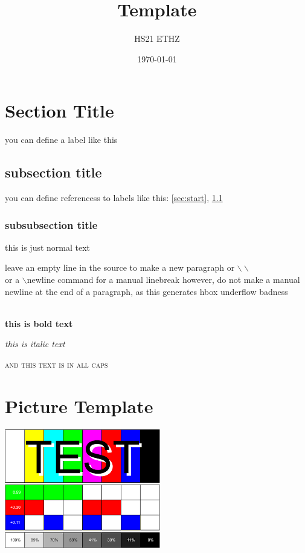 \documentclass[a4paper,10pt,landscape]{scrartcl}
\title{Template}
\subtitle{HS21 ETHZ}
\author{}
\date{\today}
\begin{document}
\begin{multicols*}{3}
%
\maketitle
%
\section{Section Title}
you can define a label like this \label{sec:start}
\subsection{subsection title} \label{sec:second}
you can define referencess to labels like this: \ref{sec:start}, \ref{sec:second}
\subsubsection{subsubsection title}
this is just normal text

leave an empty line in the source to make a new paragraph
or $\backslash\backslash$ \\
or a $\backslash$newline command for a manual linebreak\newline
however, do not make a manual newline at the end of a paragraph, as this generates hbox underflow badness \\

\\

\textbf{this is bold text}

\textit{this is italic text}

\textsc{and this text is in all caps}

\vfill\null %
\columnbreak
%
\section{Picture Template}
\includegraphics[width=\columnwidth]{images/test.png}
%

\end{multicols*}
\end{document}
